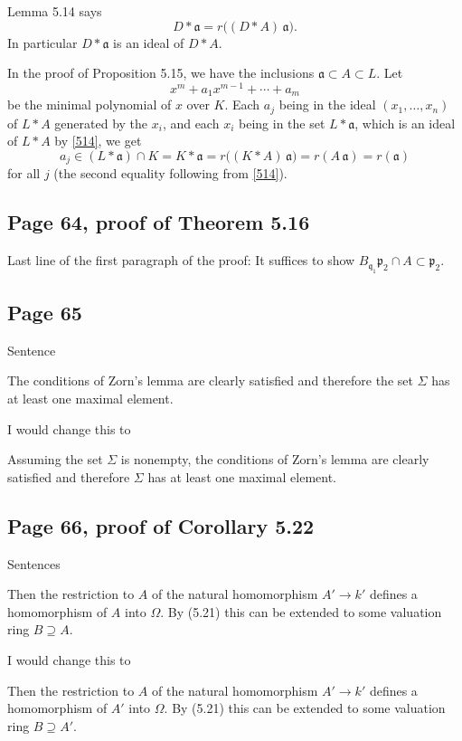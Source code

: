 \documentclass[parskip=half,fontsize=12pt]{scrartcl}%
\newcommand{\mf}{\mathfrak}
\newcommand{\ppp}{\mf p}
\begin{document}
Lemma 5.14 says
\begin{equation}\label{514}
D*\mf a=r\Big((D*A)\,\mf a\Big).
\end{equation}
In particular $D*\mf a$ is an ideal of $D*A$. 

In the proof of Proposition 5.15, we have the inclusions $\mf a\subset A\subset L$. Let 
$$
x^m+a_1x^{m-1}+\cdots+a_m
$$ 
be the minimal polynomial of $x$ over $K$. Each $a_j$ being in the ideal $(x_1,\dots,x_n)$ of $L*A$ generated by the $x_i$, and each $x_i$ being in the set $L*\mf a$, which is an ideal of $L*A$ by \eqref{514}, we get 
$$
a_j\in(L*\mf a)\cap K=K*\mf a=r\Big((K*A)\,\mf a\Big)=r(A\,\mf a)=r(\mf a)
$$ 
for all $j$ (the second equality following from \eqref{514}).

\subsection{Page 64, proof of Theorem 5.16}%

Last line of the first paragraph of the proof: It suffices to show $B_{\mf q_1}\ppp_2\cap A\subset\ppp_2$.

\subsection{Page 65}%

Sentence

The conditions of Zorn's lemma are clearly satisfied and therefore the set $\Sigma$ has at least one maximal element.

I would change this to 

Assuming the set $\Sigma$ is nonempty, the conditions of Zorn's lemma are clearly satisfied and therefore $\Sigma$ has at least one maximal element.

\subsection{Page 66, proof of Corollary 5.22}%

Sentences

Then the restriction to $A$ of the natural homomorphism $A'\to k'$ defines a homomorphism of $A$ into $\Omega$. By (5.21) this can be extended to some valuation ring $B\supseteq A$.

I would change this to 

Then the restriction to $A$ of the natural homomorphism $A'\to k'$ defines a homomorphism of $A'$ into $\Omega$. By (5.21) this can be extended to some valuation ring $B\supseteq A'$.
\end{document}
